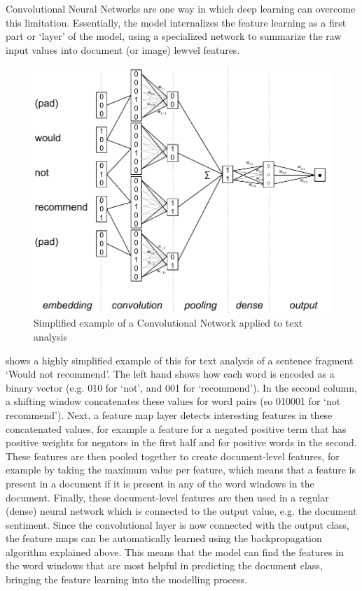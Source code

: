 Convolutional Neural Networks are one way in which deep learning can overcome this limitation.
Essentially, the model internalizes the feature learning as a first part or `layer' of the model,
using a specialized network to summarize the raw input values into document (or image) lewvel features. 



\begin{figure}
  \centering\includegraphics[width=.8\linewidth]{figures/ch09_cnn_cropped.pdf}
  \caption{Simplified example of a Convolutional Network applied to text analysis}
  \label{fig:cnn}
  \end{figure}

 shows a highly simplified example of this for text analysis of a sentence fragment `Would not recommend'.
The left hand shows how each word is encoded as a binary vector (e.g. 010 for `not', and 001 for `recommend').
In the second column, a shifting window concatenates these values for word pairs (so 010001 for `not recommend').
Next, a feature map layer detects interesting features in these concatenated values, for example
a feature for a negated positive term that has positive weights for negators in the first half and for positive words in the second.
These features are then pooled together to create document-level features,
for example by taking the maximum value per feature, which means that a feature is present in a document if it is present in any of the word windows in the document.
Finally, these document-level features are then used in a regular (dense) neural network which is connected to the output value, e.g. the document sentiment.
Since the convolutional layer is now connected with the output class, the feature maps can be automatically learned using the backpropagation algorithm explained above.
This means that the model can find the features in the word windows that are most helpful in predicting the document class, bringing the feature learning into the modelling process.

